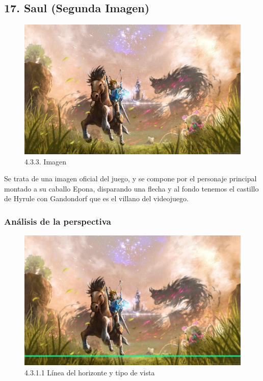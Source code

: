 \documentclass[12pt]{article}
\begin{document}
    \subsection{17. Saul (Segunda Imagen)}
    \begin{figure}[H]
      \centering
      \includegraphics[scale=0.7]{images/Saúl/Sección 17/EA_img17_0Main.png}
      \caption{\small 4.3.3. Imagen}
    \end{figure}
    Se trata de una imagen oficial del juego, y se compone por el personaje principal montado a su caballo Epona, disparando una flecha y al fondo tenemos el castillo de Hyrule con Gandondorf que es el villano del videojuego.

    
        \subsubsection{Análisis de la perspectiva}


    \begin{figure}[H]
      \centering
      \includegraphics[scale=0.7]{images/Saúl/Sección 17/EA_img17_1Perspectiva_1LineaTierra-TipoVista.png}
      \caption{\small 4.3.1.1 Línea del horizonte y tipo de vista}
    \end{figure}
\end{document}
